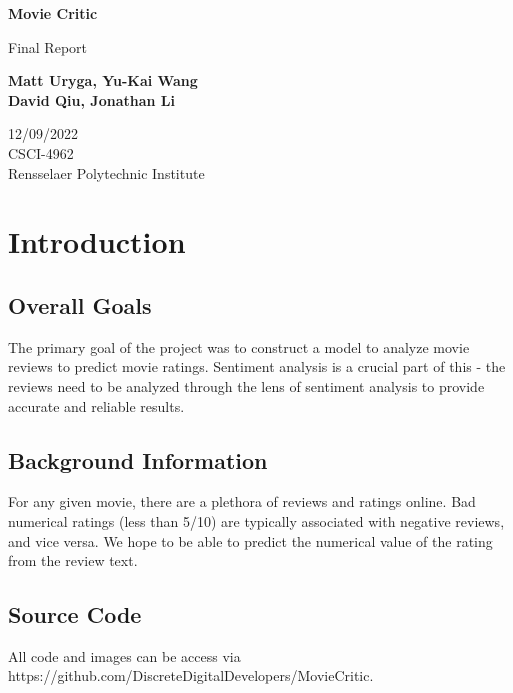 \documentclass[11pt]{article}
\newcommand{\np}{\newpage}
\begin{document}
\begin{titlepage}
\begin{center}
	\vspace*{1cm}

	\textbf{\Huge Movie Critic}

	\vspace{0.5cm}
	{\Large Final Report}

	\vspace{1.5cm}

	\textbf{Matt Uryga, Yu-Kai Wang\\David Qiu, Jonathan Li}

	\vfill

	12/09/2022\\
	CSCI-4962\\
	Rensselaer Polytechnic Institute
\end{center}
\end{titlepage}

\setcounter{secnumdepth}{4}
\setcounter{tocdepth}{4}

\tableofcontents
\np

\section{Introduction}
\subsection{Overall Goals}
The primary goal of the project was to construct a model to analyze movie reviews to predict movie ratings.  Sentiment analysis is a crucial part of this - the reviews need to be analyzed through the lens of sentiment analysis to provide accurate and reliable results.


\subsection{Background Information}
For any given movie, there are a plethora of reviews and ratings online.  Bad numerical ratings (less than 5/10) are typically associated with negative reviews, and vice versa.  We hope to be able to predict the numerical value of the rating from the review text.

\subsection{Source Code}
All code and images can be access via https://github.com/DiscreteDigitalDevelopers/MovieCritic.
\end{document}
